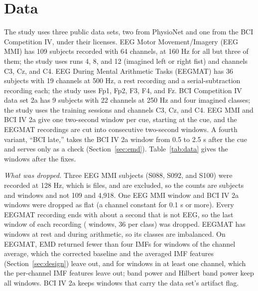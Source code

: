 \section{Data}
\label{sec:data}

The study uses three public data sets, two from PhysioNet \cite{goldberger2000,pollard2026} and one from the BCI Competition IV, under their licenses. EEG Motor Movement/Imagery (EEG MMI) \cite{schalk2004,eegmmidb} has 109 subjects recorded with 64 channels, at 160 Hz for all but three of them; the study uses runs 4, 8, and 12 (imagined left or right fist) and channels C3, Cz, and C4. EEG During Mental Arithmetic Tasks (EEGMAT) \cite{zyma2019,eegmat} has 36 subjects with 19 channels at 500 Hz, a rest recording and a serial-subtraction recording each; the study uses Fp1, Fp2, F3, F4, and Fz. BCI Competition IV data set 2a \cite{brunner2008,tangermann2012} has 9 subjects with 22 channels at 250 Hz and four imagined classes; the study uses the training sessions and channels C3, Cz, and C4. EEG MMI and BCI IV 2a give one two-second window per cue, starting at the cue, and the EEGMAT recordings are cut into consecutive two-second windows. A fourth variant, ``BCI late,'' takes the BCI IV 2a window from 0.5 to 2.5 s after the cue and serves only as a check (Section~\ref{sec:emd}). Table~\ref{tab:data} gives the windows after the fixes.

\begin{table}[t]
\caption{The data sets after the fixes. Subjects, windows, classes, channels, and sampling rate.}
\label{tab:data}
\centering
\scriptsize
\setlength{\tabcolsep}{2.5pt}

\end{table}

\emph{What was dropped.} Three EEG MMI subjects (S088, S092, and S100) were recorded at 128 Hz, which is  files, and are excluded, so the counts are  subjects and  windows and not 109 and 4,918. One EEG MMI window and  BCI IV 2a windows were dropped as flat (a channel constant for 0.1 s or more). Every EEGMAT recording ends with about a second that is not EEG, so the last window of each recording ( windows, 36 per class) was dropped. EEGMAT has  windows at rest and  during arithmetic, so its classes are imbalanced. On EEGMAT, EMD returned fewer than four IMFs for  windows of the channel average, which the corrected baseline and the averaged IMF features (Section~\ref{sec:design}) leave out, and for  windows in at least one channel, which the per-channel IMF features leave out; band power and Hilbert band power keep all  windows. BCI IV 2a keeps  windows that carry the data set's artifact flag.
